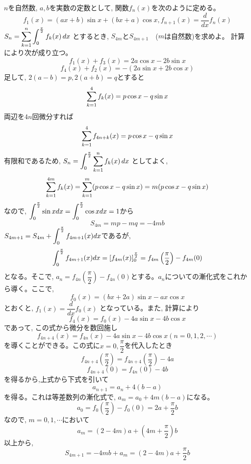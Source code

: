 $n$を自然数, $a,b$を実数の定数として, 関数$f_n(x)$を次のように定める。
\[f_1(x)=(ax+b)\sin{x}+(bx+a)\cos{x},　f_{n+1}(x)=\dfrac{d}{dx}f_n(x)\]
$S_n=\displaystyle\sum_{k=1}^n\displaystyle\int_0^{\frac{\pi}{2}}f_k(x)\, dx$ とするとき, $S_{4m}$と$S_{4m+1}$　($m$は自然数)を求めよ。
\enthm
計算により次が成り立つ。
\[ f_1(x)+f_3(x)=2a\cos{x}-2b\sin{x}\]
\[ f_4(x) +f_2(x)=-(2a\sin{x}+2b\cos{x})\]
足して, $2(a-b)=p, 2(a+b)=q$とすると
\[\displaystyle\sum_{k=1}^4f_k(x) = p\cos{x}-q\sin{x}\]
両辺を$4n$回微分すれば
\[\displaystyle\sum_{k=1}^4f_{4n+k}(x) = p\cos{x}-q\sin{x}\]
有限和であるため, $S_n =\displaystyle\int_0^{\frac{\pi}{2}} \displaystyle\sum_{k=1}^nf_k(x)\, dx$ としてよく,
\[\displaystyle\sum_{k=1}^{4m}f_k(x) = \displaystyle\sum_{k=1}^{m}(p\cos{x}-q\sin{x})=m(p\cos{x}-q\sin{x})\]
なので, $\displaystyle\int_0^{\frac{\pi}{2}}\sin{x}dx=\displaystyle\int_0^{\frac{\pi}{2}}\cos{x}dx=1$から
\[S_{4m}=mp-mq=-4mb\]
$S_{4m+1}=S_{4m}+\displaystyle\int_{0}^{\frac{\pi}{2}}f_{4m+1}(x)dx$であるが,
\[\displaystyle\int_{0}^{\frac{\pi}{2}}f_{4m+1}(x)dx=\left[ f_{4m}(x)\right]^{\frac{\pi}{2}}_0 = f_{4m}\left(\dfrac{\pi}{2}\right)-f_{4m}(0)\]
となる。そこで, $a_n=f_{4n}\left( \dfrac{\pi}{2}\right)-f_{4n}(0)$とする。$a_n$についての漸化式をこれから導く。ここで, 
\[f_0(x)=(bx+2a)\sin{x}-ax\cos{x}\]
とおくと, $f_1(x)=\dfrac{d}{dx}f_0(x)$ となっている。また, 計算により
\[f_4(x)=f_0(x)-4a\sin{x}-4b\cos{x}\]
であって, この式から微分を数回施し
\[f_{4n+4}(x)=f_{4n}(x) -4a\sin{x}-4b\cos{x}　(n=0,1,2,\cdots )\]
を導くことができる。この式に$x=0,\dfrac{\pi}{2}$を代入したとき
\[f_{4n+4}\left(\dfrac{\pi}{2}\right)=f_{4n+4}\left( \dfrac{\pi}{2}\right)-4a\]
\[f_{4n+4}(0)=f_{4n}(0)-4b\]
を得るから,上式から下式を引いて
\[a_{n+1}=a_n+4(b-a)\]
を得る。これは等差数列の漸化式で, $a_m=a_0+4m(b-a)$になる。
\[a_0=f_0\left(\dfrac{\pi}{2}\right)-f_0(0)=2a+\dfrac{\pi}{2}b\]
なので, $m=0,1,\cdots $において
\[a_m=(2-4m)a+\left(4m+\dfrac{\pi}{2}\right)b\]
以上から, 
\[S_{4m+1}=-4mb+a_m=(2-4m)a+\dfrac{\pi}{2}b\]
